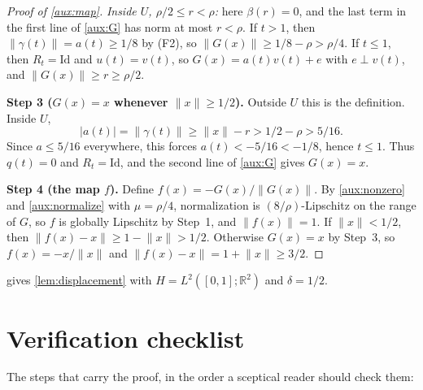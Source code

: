\documentclass[11pt]{article}
\newcommand{\R}{\mathbb R}
\newcommand{\norm}[1]{\lVert #1\rVert}
\theoremstyle{definition}
\numberwithin{equation}{section}
\newcommand{\step}[1]{\par\smallskip\noindent\textbf{Step #1.}\enspace}
\begin{document}
\begin{proof}[Proof of \cref{aux:map}]
\emph{Inside \(U\), \(\rho/2\le r<\rho\):} here \(\beta(r)=0\), and the
last term in the first line of \eqref{aux:G} has norm at most \(r<\rho\).
If \(t>1\), then \(\norm{\gamma(t)}=a(t)\ge1/8\) by (F2), so
\(\norm{G(x)}\ge1/8-\rho>\rho/4\). If \(t\le1\), then
\(R_t=\mathrm{Id}\) and \(u(t)=v(t)\), so \(G(x)=a(t)v(t)+e\) with
\(e\perp v(t)\), and \(\norm{G(x)}\ge r\ge\rho/2\).

\step{3 (\(G(x)=x\) whenever \(\norm x\ge1/2\))}
Outside \(U\) this is the definition. Inside \(U\),
\[
 |a(t)|=\norm{\gamma(t)}\ge\norm x-r>1/2-\rho>5/16.
\]
Since \(a\le5/16\) everywhere, this forces \(a(t)<-5/16<-1/8\), hence
\(t\le1\). Thus \(q(t)=0\) and \(R_t=\mathrm{Id}\), and the second line of
\eqref{aux:G} gives \(G(x)=x\).

\step{4 (the map \(f\))}
Define \(f(x)=-G(x)/\norm{G(x)}\). By \eqref{aux:nonzero} and
\eqref{aux:normalize} with \(\mu=\rho/4\), normalization is
\((8/\rho)\)-Lipschitz on the range of \(G\), so \(f\) is globally
Lipschitz by Step~1, and \(\norm{f(x)}=1\). If \(\norm x<1/2\), then
\(\norm{f(x)-x}\ge1-\norm x>1/2\). Otherwise \(G(x)=x\) by Step~3, so
\(f(x)=-x/\norm x\) and \(\norm{f(x)-x}=1+\norm x\ge3/2\).
\end{proof}

 gives \cref{lem:displacement} with \(H=L^2([0,1];\R^2)\) and
\(\delta=1/2\).

\section*{Verification checklist}

The steps that carry the proof, in the order a sceptical reader should
check them:
\end{document}
